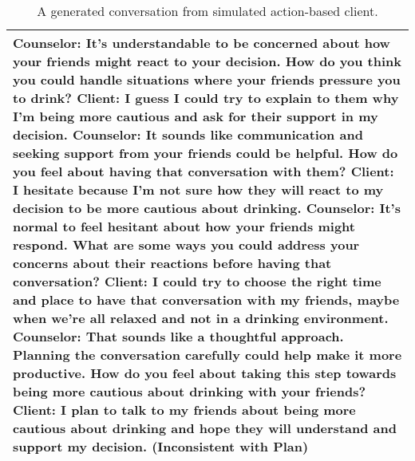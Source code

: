 \begin{table*}[tb]
\begin{tabularx}{\textwidth}{X}
Counselor: It's understandable to be concerned about how your friends might react to your decision. How do you think you could handle situations where your friends pressure you to drink? \newline
Client: I guess I could try to explain to them why I'm being more cautious and ask for their support in my decision. \newline
Counselor: It sounds like communication and seeking support from your friends could be helpful. How do you feel about having that conversation with them? \newline
Client: I hesitate because I'm not sure how they will react to my decision to be more cautious about drinking. \newline
Counselor: It's normal to feel hesitant about how your friends might respond. What are some ways you could address your concerns about their reactions before having that conversation? \newline
Client: I could try to choose the right time and place to have that conversation with my friends, maybe when we're all relaxed and not in a drinking environment. \newline
Counselor: That sounds like a thoughtful approach. Planning the conversation carefully could help make it more productive. How do you feel about taking this step towards being more cautious about drinking with your friends? \newline
Client: {\color{red} I plan to talk to my friends about being more cautious about drinking and hope they will understand and support my decision. (Inconsistent with Plan)} \\ \bottomrule
\end{tabularx}
\caption{A generated conversation from simulated action-based client.}
\label{tab:action-based conv}
\end{table*}


